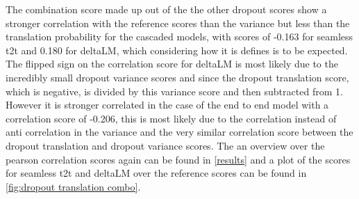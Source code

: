 The combination score made up out of the the other dropout scores show a stronger correlation with the reference scores than the variance but less than the translation probability for the cascaded models, with scores of -0.163 for seamless t2t and 0.180 for deltaLM, which considering how it is defines is to be expected. 
The flipped sign on the correlation score for deltaLM is most likely due to the incredibly small dropout variance scores and since the dropout translation score, which is negative, is divided by this variance score and then subtracted from 1.
However it is stronger correlated in the case of the end to end model with a correlation score of -0.206, this is most likely due to the correlation instead of anti correlation in the variance and the very similar correlation score between the dropout translation and dropout variance scores. 
The an overview over the pearson correlation scores again can be found in \autoref{results} and a plot of the scores for seamless t2t and deltaLM over the reference scores can be found in \autoref{fig:dropout translation combo}. 

